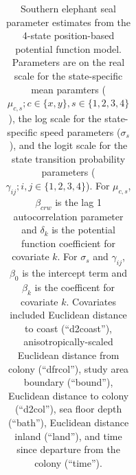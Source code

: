 \documentclass{rgclass}
\begin{document}
\begin{longtable}{@{}lrrrr@{}}
\caption{Southern elephant seal parameter estimates from the 4-state position-based potential function model. Parameters are on the real scale for the state-specific mean paramters ($\mu_{c,s}; c \in \{x,y\}, s \in \{1,2,3,4\}$), the log scale for the state-specific speed parameters ($\sigma_s$), and the logit scale for the state transition probability parameters ($\gamma_{ij}; i,j \in \{1,2,3,4\}$). For $\mu_{c,s}$, $\beta_{crw}$ is the lag 1 autocorrelation parameter and $\delta_k$ is the potential function coefficient for covariate $k$. For $\sigma_s$ and $\gamma_{ij}$, $\beta_0$ is the intercept term and $\beta_k$ is the coefficent for covariate $k$. Covariates included Euclidean distance to coast (``d2coast''), anisotropically-scaled Euclidean distance from colony (``dfrcol''), study area boundary (``bound''), Euclidean distance to colony (``d2col''), sea floor depth (``bath''), Euclidean distance inland (``land''), and time since departure from the colony (``time'').} \label{tab:model_params} \\


\end{longtable}
\end{document}
